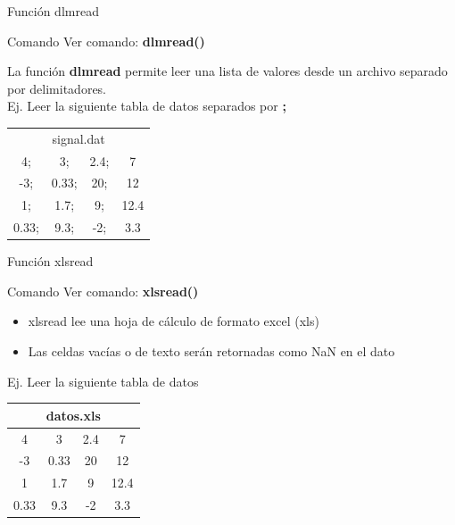 \documentclass{bredelebeamer}
\begin{document}
\begin{frame}{Función dlmread}
\begin{exampleblock}{Comando}
Ver comando: \textbf{dlmread()}
\end{exampleblock}
La función \textbf{dlmread} permite leer una lista de valores desde un archivo separado por delimitadores.\\
Ej. Leer la siguiente tabla de datos separados por \textbf{;}
\begin{table}[]
\centering
\begin{tabular}{cccc}
\multicolumn{4}{c}{signal.dat} \\
4;     & 3;     & 2.4;  & 7    \\
-3;    & 0.33;  & 20;   & 12   \\
1;     & 1.7;   & 9;    & 12.4 \\
0.33;  & 9.3;   & -2;   & 3.3 
\end{tabular}
\end{table}
\begin{center}

\end{center}
\end{frame}

\begin{frame}{Función xlsread}
\begin{exampleblock}{Comando}
Ver comando: \textbf{xlsread()}
\end{exampleblock}
\begin{itemize}
\item xlsread lee una hoja de cálculo de formato excel (xls)
\item Las celdas vacías o de texto serán retornadas como NaN en el dato
\end{itemize}
Ej. Leer la siguiente tabla de datos
\begin{table}[]
\centering
\begin{tabular}{cccc}
\multicolumn{4}{c}{datos.xls}                                                                                    \\ \hline
\multicolumn{1}{|c|}{4}    & \multicolumn{1}{c|}{3}    & \multicolumn{1}{c|}{2.4} & \multicolumn{1}{c|}{7}    \\ \hline
\multicolumn{1}{|c|}{-3}   & \multicolumn{1}{c|}{0.33} & \multicolumn{1}{c|}{20}  & \multicolumn{1}{c|}{12}   \\ \hline
\multicolumn{1}{|c|}{1}    & \multicolumn{1}{c|}{1.7}  & \multicolumn{1}{c|}{9}   & \multicolumn{1}{c|}{12.4} \\ \hline
\multicolumn{1}{|c|}{0.33} & \multicolumn{1}{c|}{9.3}  & \multicolumn{1}{c|}{-2}  & \multicolumn{1}{c|}{3.3}  \\ \hline
\end{tabular}
\end{table}
\begin{center}

\end{center}
\end{frame}
\end{document}
